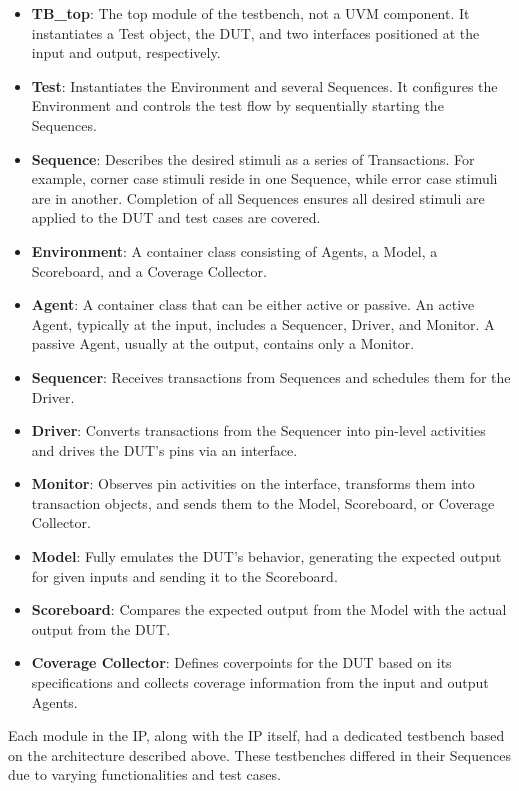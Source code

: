 \documentclass[conference]{IEEEtran}
\begin{document}
\begin{itemize}
    \item \textbf{TB\_top}: The top module of the testbench, not a UVM component. It instantiates a Test object, the DUT, and two interfaces positioned at the input and output, respectively.
    \item \textbf{Test}: Instantiates the Environment and several Sequences. It configures the Environment and controls the test flow by sequentially starting the Sequences.
    \item \textbf{Sequence}: Describes the desired stimuli as a series of Transactions. For example, corner case stimuli reside in one Sequence, while error case stimuli are in another. Completion of all Sequences ensures all desired stimuli are applied to the DUT and test cases are covered.
    \item \textbf{Environment}: A container class consisting of Agents, a Model, a Scoreboard, and a Coverage Collector.
    \item \textbf{Agent}: A container class that can be either active or passive. An active Agent, typically at the input, includes a Sequencer, Driver, and Monitor. A passive Agent, usually at the output, contains only a Monitor.
    \item \textbf{Sequencer}: Receives transactions from Sequences and schedules them for the Driver.
    \item \textbf{Driver}: Converts transactions from the Sequencer into pin-level activities and drives the DUT's pins via an interface.
    \item \textbf{Monitor}: Observes pin activities on the interface, transforms them into transaction objects, and sends them to the Model, Scoreboard, or Coverage Collector.
    \item \textbf{Model}: Fully emulates the DUT's behavior, generating the expected output for given inputs and sending it to the Scoreboard.
    \item \textbf{Scoreboard}: Compares the expected output from the Model with the actual output from the DUT.
    \item \textbf{Coverage Collector}: Defines coverpoints for the DUT based on its specifications and collects coverage information from the input and output Agents.
\end{itemize}

Each module in the IP, along with the IP itself, had a dedicated testbench based on the architecture described above. These testbenches differed in their Sequences due to varying functionalities and test cases.
\end{document}
